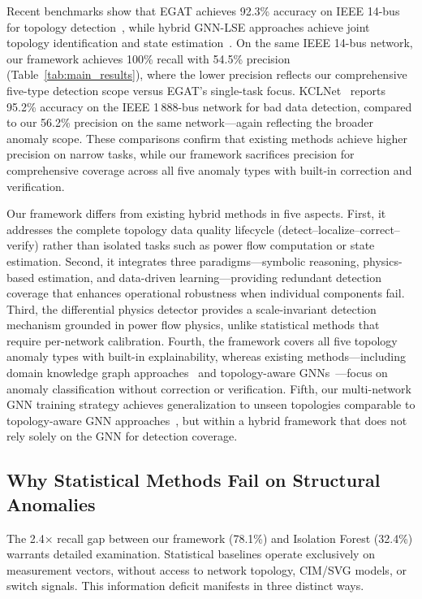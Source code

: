 \documentclass[research]{fcs}
\begin{document}
Recent benchmarks show that EGAT achieves 92.3\% accuracy on IEEE 14-bus for topology detection~\cite{egat2025}, while hybrid GNN-LSE approaches achieve joint topology identification and state estimation~\cite{hybrid_gnn_lse2025}. On the same IEEE 14-bus network, our framework achieves 100\% recall with 54.5\% precision (Table~\ref{tab:main_results}), where the lower precision reflects our comprehensive five-type detection scope versus EGAT's single-task focus. KCLNet~\cite{kclnet2026} reports 95.2\% accuracy on the IEEE 1\,888-bus network for bad data detection, compared to our 56.2\% precision on the same network---again reflecting the broader anomaly scope. These comparisons confirm that existing methods achieve higher precision on narrow tasks, while our framework sacrifices precision for comprehensive coverage across all five anomaly types with built-in correction and verification.

Our framework differs from existing hybrid methods in five aspects. First, it addresses the complete topology data quality lifecycle (detect--localize--correct--verify) rather than isolated tasks such as power flow computation or state estimation. Second, it integrates three paradigms---symbolic reasoning, physics-based estimation, and data-driven learning---providing redundant detection coverage that enhances operational robustness when individual components fail. Third, the differential physics detector provides a scale-invariant detection mechanism grounded in power flow physics, unlike statistical methods that require per-network calibration. Fourth, the framework covers all five topology anomaly types with built-in explainability, whereas existing methods---including domain knowledge graph approaches~\cite{expert_gnn_kg2025} and topology-aware GNNs~\cite{tpgse2025}---focus on anomaly classification without correction or verification. Fifth, our multi-network GNN training strategy achieves generalization to unseen topologies comparable to topology-aware GNN approaches~\cite{tpgse2025}, but within a hybrid framework that does not rely solely on the GNN for detection coverage.

\subsection{Why Statistical Methods Fail on Structural Anomalies}

The 2.4$\times$ recall gap between our framework (78.1\%) and Isolation Forest (32.4\%) warrants detailed examination. Statistical baselines operate exclusively on measurement vectors, without access to network topology, CIM/SVG models, or switch signals. This information deficit manifests in three distinct ways.
\end{document}
